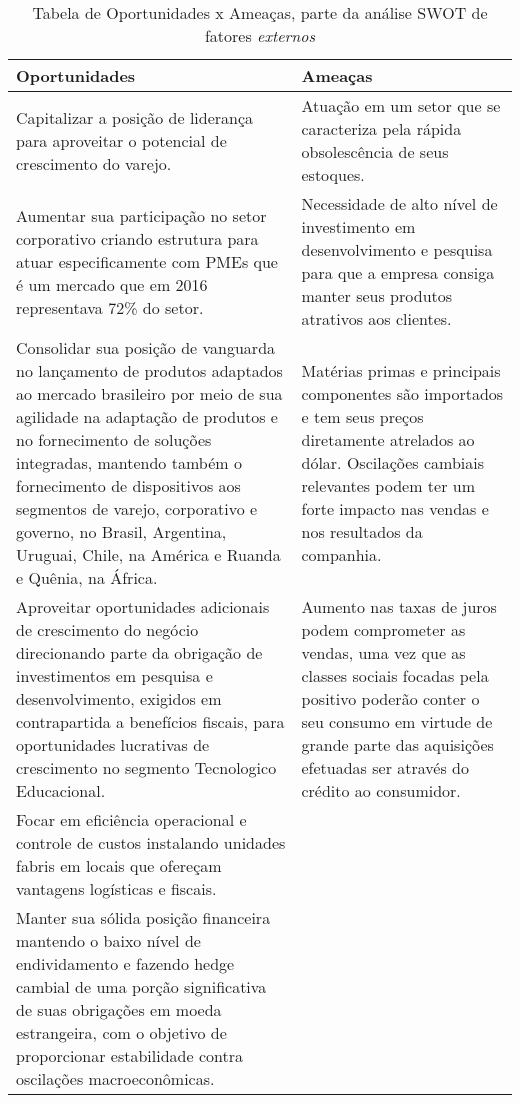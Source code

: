 {{{{\begin{center}
\begin{table}[H]
\begin{centering}
\begin{tabular}{>{\centering}p{}|>{\centering}p{}}
\hline 
Oportunidades & Ameaças\tabularnewline
\hline 
Capitalizar a posição de liderança para aproveitar o potencial de
crescimento do varejo. & Atuação em um setor que se caracteriza pela rápida obsolescência de
seus estoques.\tabularnewline
\hline 
Aumentar sua participação no setor corporativo criando estrutura para
atuar especificamente com PMEs que é um mercado que em 2016 representava
72\% do setor.  & Necessidade de alto nível de investimento em desenvolvimento e pesquisa
para que a empresa consiga manter seus produtos atrativos aos clientes.\tabularnewline
\hline 
Consolidar sua posição de vanguarda no lançamento de produtos adaptados
ao mercado brasileiro por meio de sua agilidade na adaptação de produtos
e no fornecimento de soluções integradas, mantendo também o fornecimento
de dispositivos aos segmentos de varejo, corporativo e governo, no
Brasil, Argentina, Uruguai, Chile, na América e Ruanda e Quênia, na
África. & Matérias primas e principais componentes são importados e tem seus
preços diretamente atrelados ao dólar. Oscilações cambiais relevantes
podem ter um forte impacto nas vendas e nos resultados da companhia.\tabularnewline
\hline 
Aproveitar oportunidades adicionais de crescimento do negócio direcionando
parte da obrigação de investimentos em pesquisa e desenvolvimento,
exigidos em contrapartida a benefícios fiscais, para oportunidades
lucrativas de crescimento no segmento Tecnologico Educacional.  & Aumento nas taxas de juros podem comprometer as vendas, uma vez que
as classes sociais focadas pela positivo poderão conter o seu consumo
em virtude de grande parte das aquisições efetuadas ser através do
crédito ao consumidor. \tabularnewline
\hline 
Focar em eficiência operacional e controle de custos instalando unidades
fabris em locais que ofereçam vantagens logísticas e fiscais.  & \tabularnewline
\hline 
Manter sua sólida posição financeira mantendo o baixo nível de endividamento
e fazendo hedge cambial de uma porção significativa de suas obrigações
em moeda estrangeira, com o objetivo de proporcionar estabilidade
contra oscilações macroeconômicas.  & \tabularnewline
\hline 
\end{tabular}
\par\end{centering}
\caption{Tabela de Oportunidades x Ameaças, parte da análise SWOT de fatores \emph{externos}}
\end{table}
\par\end{center}

}}}}
